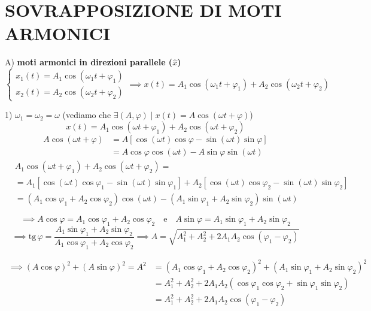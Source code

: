 \documentclass{article}
\begin{document}
\section*{SOVRAPPOSIZIONE DI MOTI ARMONICI}

A) \textbf{moti armonici in direzioni parallele ($\hat{x}$)}
\begin{equation*}
\begin{cases}
x_1(t) = A_1 \cos(\omega_1 t + \varphi_1) \\
x_2(t) = A_2 \cos(\omega_2 t + \varphi_2)
\end{cases}
\implies x(t) = A_1 \cos(\omega_1 t + \varphi_1) + A_2 \cos(\omega_2 t + \varphi_2)
\end{equation*}

1) $\omega_1 = \omega_2 = \omega$ (vediamo che $\exists (A, \varphi) \mid x(t) = A \cos(\omega t + \varphi)$)
\begin{equation*}
x(t) = A_1 \cos(\omega t + \varphi_1) + A_2 \cos(\omega t + \varphi_2)
\end{equation*}
\begin{align*}
A \cos(\omega t + \varphi) &= A [\cos(\omega t)\cos\varphi - \sin(\omega t)\sin\varphi] \\
&= A \cos\varphi \cos(\omega t) - A \sin\varphi \sin(\omega t)
\end{align*}
\begin{align*}
&A_1 \cos(\omega t + \varphi_1) + A_2 \cos(\omega t + \varphi_2) = \\
&= A_1 [\cos(\omega t)\cos\varphi_1 - \sin(\omega t)\sin\varphi_1] + A_2 [\cos(\omega t)\cos\varphi_2 - \sin(\omega t)\sin\varphi_2] \\
&= (A_1 \cos\varphi_1 + A_2 \cos\varphi_2)\cos(\omega t) - (A_1 \sin\varphi_1 + A_2 \sin\varphi_2)\sin(\omega t)
\end{align*}

\begin{equation*}
\implies A \cos\varphi = A_1 \cos\varphi_1 + A_2 \cos\varphi_2 \quad \text{e} \quad A \sin\varphi = A_1 \sin\varphi_1 + A_2 \sin\varphi_2
\end{equation*}
\begin{equation*}
\implies \text{tg}\,\varphi = \frac{A_1 \sin\varphi_1 + A_2 \sin\varphi_2}{A_1 \cos\varphi_1 + A_2 \cos\varphi_2} \implies A = \sqrt{A_1^2 + A_2^2 + 2A_1 A_2 \cos(\varphi_1 - \varphi_2)}
\end{equation*}

\begin{align*}
\implies (A \cos\varphi)^2 + (A \sin\varphi)^2 = A^2 &= (A_1 \cos\varphi_1 + A_2 \cos\varphi_2)^2 + (A_1 \sin\varphi_1 + A_2 \sin\varphi_2)^2 \\
&= A_1^2 + A_2^2 + 2A_1 A_2 (\cos\varphi_1 \cos\varphi_2 + \sin\varphi_1 \sin\varphi_2) \\
&= A_1^2 + A_2^2 + 2A_1 A_2 \cos(\varphi_1 - \varphi_2)
\end{align*}
\end{document}
